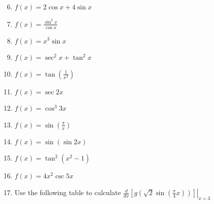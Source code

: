 \documentclass[12pt]{article}
\newif\ifans
\begin{document}
\begin{enumerate}
\setcounter{enumi}{5}

\item $f(x) = 2\cos{x}+4\sin{x}$ 

\ifans{\fbox{$-2\sin{x}+4\cos{x}$}} \fi

\item $f(x) = \frac{\sin^2{x}}{\cos{x}}$ 

\ifans{\fbox{$2\sin{x}+\sin{x}\tan^{2}{x} $}} \fi

\item $f(x) = x^3\sin{x}$ 

\ifans{\fbox{$3x^2\sin{x}+x^3\cos{x}$}} \fi

\item $f(x) = \sec^2{x}+\tan^2{x}$ 

\ifans{\fbox{$4\sec^2{(x)}\tan{(x)}$}} \fi

\item $f(x) = \tan{\left(\frac{1}{x^2}\right)}$ 

\ifans{\fbox{$-2x^{-3}\sec^2{\left(\frac{1}{x^2}\right)}$}} \fi

\item $f(x) = \sec{2x}$ 

\ifans{\fbox{$2\sec{(2x)}\tan{(2x)}$}} \fi

\item $f(x) = \cos^3{3x}$ 

\ifans{\fbox{$-9\sin{(3x)}\cos^2{(3x)}$}} \fi

\item $f(x) = \sin {\left(\frac{\pi}{x}\right)}$ 

\ifans{\fbox{$-\pi x^{-2}\cos{\left(\frac{\pi}{x}\right)}$}} \fi

\item $f(x) = \sin{(\sin{2x})}$ 

\ifans{\fbox{$2\cos{(\sin{2x})}\cos{2x}$}} \fi

\item $f(x) = \tan^2{(x^2-1)}$ 

\ifans{\fbox{$4x\tan{(x^2-1)}\sec^2{(x^2-1)}$}} \fi

\item $f(x)=4x^2\csc{5x}$

\ifans{\fbox{$8x\csc{(5x)}-20x^2\csc{(5x)}\cot{(5x)}$}} \fi

\item Use the following table to calculate $\left.\frac{d}{dx}\left[g\left(\sqrt{2}\sin{\left(\frac{\pi}{4}x\right)}\right)\right]\right|_{x=3}$


\end{enumerate}
\end{document}

